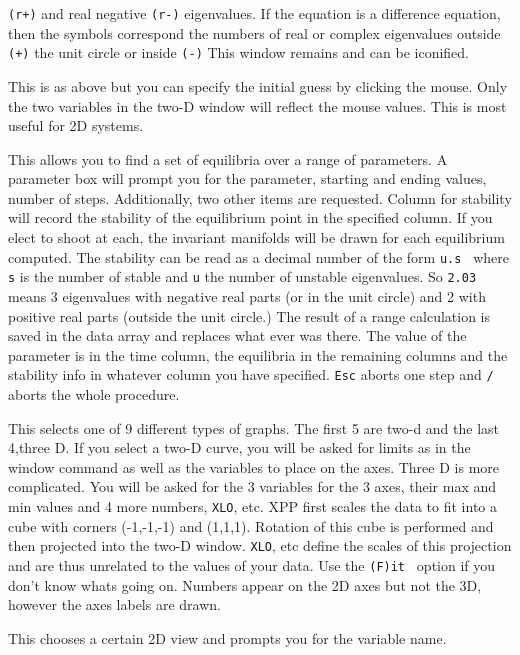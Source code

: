 \begin{description}
\begin{description}
{\tt  (r+)}  and 
real negative { \tt (r-)}  eigenvalues. If the equation is a difference equation, 
then the symbols correspond the numbers of real or complex eigenvalues 
outside {\tt (+)}  the unit circle or inside { \tt (-)}
This window remains and can be iconified. 
\item[(M)ouse]  This is as above but you can specify the initial guess by 
clicking the mouse.  Only the two variables in the two-D window will reflect 
the mouse values.  This is most useful for 2D systems.
\item[(R)ange]  This allows you to find a set of equilibria over a range
 of parameters.  A parameter box will prompt you for the parameter, starting
 and ending values, number of steps.  Additionally, two other items are 
requested.  Column for stability will record the stability of the equilibrium 
point in the specified column.  If you elect to shoot at each, the invariant 
manifolds will be drawn for each equilibrium computed.  The stability can be 
read as a decimal number of the form {\tt  u.s } where {\tt s}  is the
number of stable and {\tt u} 
 the number of unstable eigenvalues. So {\tt 2.03} means 3 eigenvalues
with negative real parts (or in the unit circle) and 2 with positive
real parts (outside the unit circle.)  The result of a range calculation is saved 
in the data array and replaces what ever was there.  The value of the parameter
 is in the time column, the equilibria in the remaining columns and the 
stability info in whatever column you have specified. 
 {\tt Esc} aborts one step and 
{\tt /}  aborts the whole procedure.
\end{description} 
\item[(V)iew axes]  This selects one of 9 different types of graphs. 
The first 5 are two-d 
and the last 4,three D. If you select a two-D curve, you will be asked for limits 
as in the window command as well as the variables to place on the axes.  Three 
D is more complicated.  You will be asked for the 3 variables for the 3 axes, 
their max and min values and 4 more numbers, {\tt XLO},  etc.  XPP first scales the 
data to fit into a cube with corners (-1,-1,-1) and (1,1,1).  Rotation of this
 cube is performed and then projected into the two-D window.  {\tt XLO}, etc define
 the scales of this projection and are thus unrelated to the values of your 
data.  Use the {\tt (F)it } option if you don't know whats going on.
Numbers appear
 on the 2D axes but not the 3D, however the axes labels are drawn.
\item[(X)i vs t]  This chooses a certain 2D view and prompts you for the variable name. 

\end{description}
